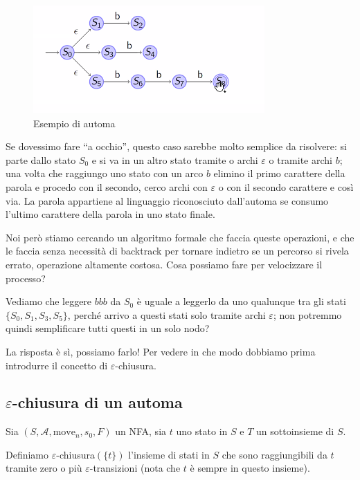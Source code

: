 \documentclass[class=book, crop=false, oneside, 12pt]{standalone}
\begin{document}
\begin{figure}
    \centering
    \includegraphics[width=.6\textwidth,keepaspectratio]{automa_secondo_esempio}
    \caption{Esempio di automa}
    \label{automa_secondo_esempio}
\end{figure}

Se dovessimo fare “a occhio”, questo caso sarebbe molto semplice da risolvere: si parte dallo stato \(S_0\) e si va in un altro stato tramite o archi \(\varepsilon\) o tramite archi \(b\); una volta che raggiungo uno stato con un arco \(b\) elimino il primo carattere della parola e procedo con il secondo, cerco archi con \(\varepsilon\) o con il secondo carattere e così via.
La parola appartiene al linguaggio riconosciuto dall’automa se consumo l’ultimo carattere della parola in uno stato finale.

Noi però stiamo cercando un algoritmo formale che faccia queste operazioni, e che le faccia senza necessità di backtrack per tornare indietro se un percorso si rivela errato, operazione altamente costosa.
Cosa possiamo fare per velocizzare il processo?

Vediamo che leggere \(bbb\) da \(S_0\) è uguale a leggerlo da uno qualunque tra gli stati \(\{S_0, S_1, S_3, S_5\}\), perché arrivo a questi stati solo tramite archi \(\varepsilon\); non potremmo quindi semplificare tutti questi in un solo nodo?

La risposta è sì, possiamo farlo! Per vedere in che modo dobbiamo prima introdurre il concetto di \(\varepsilon\)-chiusura.


\subsection{\(\varepsilon\)-chiusura di un automa}
Sia \((S, \mathcal{A}, \textrm{move}_n, s_0, F)\) un NFA, sia \(t\) uno stato in \(S\) e \(T\) un sottoinsieme di \(S\).

Definiamo \(\varepsilon\)-chiusura\((\{t\})\) l’insieme di stati in \(S\) che sono raggiungibili da \(t\) tramite zero o più \(\varepsilon\)-transizioni (nota che \(t\) è sempre in questo insieme).
\end{document}
